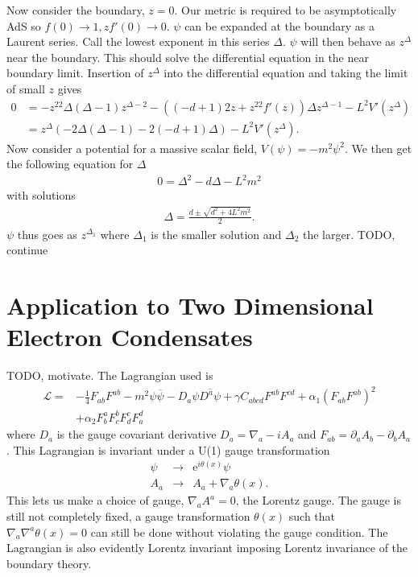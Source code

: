 \documentclass[12pt]{book}
\begin{document}
Now consider the boundary, $z=0$. Our metric is required to be asymptotically AdS so $f(0)\rightarrow1, zf'(0)\rightarrow0$. $\psi$ can be expanded at the boundary as a Laurent series. Call the lowest exponent in this series $\Delta$. $\psi$ will then behave as $z^\Delta$ near the boundary. This should solve the differential equation in the near boundary limit. Insertion of $z^\Delta$ into the differential equation and taking the limit of small $z$ gives
\begin{equation}
\begin{split}
0&=-z^22\Delta(\Delta-1)z^{\Delta-2}-\left((-d+1)2z + z^22f'(z)\right)\Delta z^{\Delta-1} -L^2V'(z^{\Delta})\\
&=z^{\Delta}\left(-2\Delta(\Delta-1)-2(-d+1)\Delta\right)-L^2V'(z^{\Delta}).
\end{split}
\end{equation}
Now consider a potential for a massive scalar field, $V(\psi)=-m^2\psi^2$. We then get the following equation for $\Delta$
\begin{equation}
\begin{split}
0=\Delta^2-d\Delta-L^2m^2
\end{split}
\end{equation}
with solutions
\begin{equation}
\begin{split}
\Delta=\frac{d\pm\sqrt{d^2+4L^2m^2}}{2}.
\end{split}
\end{equation}
$\psi$ thus goes as $z^{\Delta_1}$ where $\Delta_1$ is the smaller solution and $\Delta_2$ the larger.
TODO, continue
\section{Application to Two Dimensional Electron Condensates}
TODO, motivate. The Lagrangian used is
\begin{eqnarray}
 \mathcal{L}=&-\frac{1}{4}F_{ab}F^{ab}-m^2\psi\overline{\psi}-D_a\psi\overline{D^a\psi}
+\gamma C_{abcd}F^{ab}F^{cd}+\alpha_1(F_{ab}F^{ab})^2\nonumber\\
&+\alpha_2F^a_bF^b_cF^c_dF^d_a
\end{eqnarray}
where $D_a$ is the gauge covariant derivative $D_a=\nabla_a-iA_a$ and $F_{ab}=\partial_aA_b-\partial_bA_a$. This Lagrangian is invariant under a U(1) gauge transformation
\begin{eqnarray}
 \psi&\rightarrow&\mathrm{e}^{i\theta(x)}\psi\\
 A_a&\rightarrow& A_a+\nabla_a\theta(x).
\end{eqnarray}
This lets us make a choice of gauge, $\nabla_aA^a=0$, the Lorentz gauge. The gauge is still not completely fixed, a gauge transformation $\theta(x)$ such that $\nabla_a\nabla^a\theta(x)=0$ can still be done without violating the gauge condition.
The Lagrangian is also evidently Lorentz invariant imposing Lorentz invariance of the boundary theory.
\end{document}
